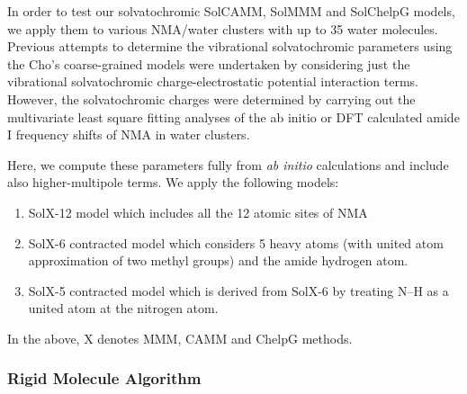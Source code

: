\documentclass[b5paper,oneside,fleqn,11pt]{book}
\begin{document}
\begin{refsection}
In order to test our solvatochromic SolCAMM, SolMMM and SolChelpG models,
we apply them to various NMA/water clusters
with up to 35 water molecules. Previous attempts \citep{Lee.Choi.Cho.JCP.2012}
to determine the vibrational solvatochromic parameters using the Cho's
coarse\hyp{}grained models were undertaken by considering just the 
vibrational solvatochromic charge\hyp{}electrostatic potential
interaction terms. However, the solvatochromic charges
were determined by carrying out the multivariate
least square fitting analyses of the ab initio or DFT calculated
amide I frequency shifts of NMA in water clusters. 

Here, we compute these
parameters fully from \emph{ab initio} calculations and include also 
higher\hyp{}multipole terms. We apply the following models:
%
\begin{enumerate}
 \item SolX-12 model which includes all the 12 atomic sites of NMA
 \item SolX-6 contracted model which considers 5 heavy atoms (with united
       atom approximation of two methyl groups) and the
       amide hydrogen atom.
 \item SolX-5 contracted model which is derived from SolX-6 by treating N--H
       as a united atom at the nitrogen atom.
\end{enumerate}
%
In the above, X denotes MMM, CAMM and ChelpG methods. 

\subsubsection{Rigid Molecule Algorithm\label{s:rigid-molecule-algorithm}}


\end{refsection}
\end{document}
